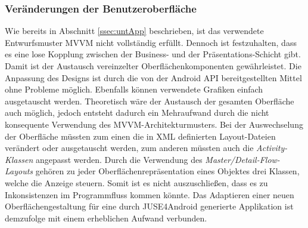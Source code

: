 \documentclass[a4paper,twoside]{article}
\begin{document}
\subsubsection{Veränderungen der Benutzeroberfläche}
Wie bereits in Abschnitt \ref{ssec:untApp} beschrieben, ist das verwendete Entwurfsmuster MVVM nicht vollständig erfüllt. Dennoch ist festzuhalten, dass es eine lose Kopplung zwischen der Business- und der Präsentations-Schicht gibt. Damit ist der Austausch vereinzelter Oberflächenkomponenten gewährleistet. Die Anpassung des Designs ist durch die von der Android API bereitgestellten Mittel ohne Probleme möglich. Ebenfalls können verwendete Grafiken einfach ausgetauscht werden. Theoretisch wäre der Austausch der gesamten Oberfläche auch möglich, jedoch entsteht dadurch ein Mehraufwand durch die nicht konsequente Verwendung des MVVM-Architekturmusters. Bei der Auswechselung der Oberfläche müssten zum einen die in XML definierten Layout-Dateien verändert oder ausgetauscht werden, zum anderen müssten auch die \textit{Activity-Klassen} angepasst werden. Durch die Verwendung des \textit{Master/Detail-Flow-Layouts} gehören zu jeder Oberflächenrepräsentation eines Objektes drei Klassen, welche die Anzeige steuern. Somit ist es nicht auszuschließen, dass es zu Inkonsistenzen im Programmfluss kommen könnte. Das Adaptieren einer neuen Oberflächengestaltung für eine durch JUSE4Android generierte Applikation ist demzufolge mit einem erheblichen Aufwand verbunden.
\\
\end{document}
